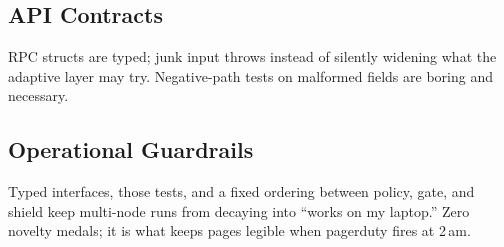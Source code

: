 \subsection{API Contracts}

RPC structs are typed; junk input throws instead of silently widening what the adaptive layer may try. Negative-path tests on malformed fields are boring and necessary.

\subsection{Operational Guardrails}

Typed interfaces, those tests, and a fixed ordering between policy, gate, and shield keep multi-node runs from decaying into ``works on my laptop.'' Zero novelty medals; it is what keeps pages legible when pagerduty fires at 2\,am.
